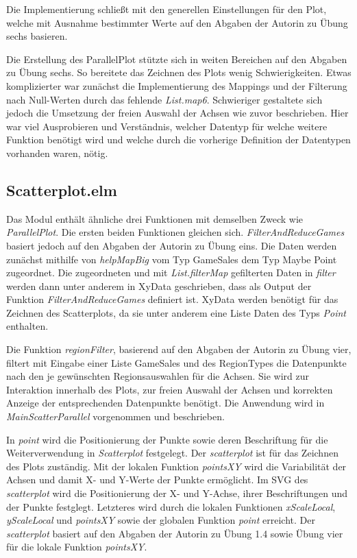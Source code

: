 \documentclass[usegeometry=true]{scrartcl}
\begin{document}
Die Implementierung schließt mit den generellen Einstellungen für den Plot, welche mit Ausnahme bestimmter Werte auf den Abgaben der Autorin zu Übung sechs basieren. 

Die Erstellung des ParallelPlot stützte sich in weiten Bereichen auf den Abgaben zu Übung sechs. 
So bereitete das Zeichnen des Plots wenig Schwierigkeiten. 
Etwas komplizierter war zunächst die Implementierung des Mappings und der Filterung nach Null-Werten durch das fehlende \textit{List.map6}. 
Schwieriger gestaltete sich jedoch die Umsetzung der freien Auswahl der Achsen wie zuvor beschrieben. 
Hier war viel Ausprobieren und Verständnis, welcher Datentyp für welche weitere Funktion benötigt wird und welche durch die vorherige Definition der Datentypen vorhanden waren, nötig.

\subsection{Scatterplot.elm}
Das Modul enthält ähnliche drei Funktionen mit demselben Zweck wie \textit{ParallelPlot}.
Die ersten beiden Funktionen gleichen sich.
\textit{FilterAndReduceGames} basiert jedoch auf den Abgaben der Autorin zu Übung eins.
Die Daten werden zunächst mithilfe von \textit{helpMapBig} vom Typ GameSales dem Typ Maybe Point zugeordnet. 
Die zugeordneten und mit \textit{List.filterMap} gefilterten Daten in \textit{filter} werden dann unter anderem in XyData geschrieben, dass als Output der Funktion \textit{FilterAndReduceGames} definiert ist.
XyData werden benötigt für das Zeichnen des Scatterplots, da sie unter anderem eine Liste Daten des Typs \textit{Point} enthalten.

Die Funktion \textit{regionFilter}, basierend auf den Abgaben der Autorin zu Übung vier, filtert mit Eingabe einer Liste GameSales und des RegionTypes die Datenpunkte nach den je gewünschten Regionsauswahlen für die Achsen. 
Sie wird zur Interaktion innerhalb des Plots, zur freien Auswahl der Achsen und korrekten Anzeige der entsprechenden Datenpunkte benötigt.
Die Anwendung wird in \textit{MainScatterParallel} vorgenommen und beschrieben.

In \textit{point} wird die Positionierung der Punkte sowie deren Beschriftung für die Weiterverwendung in \textit{Scatterplot} festgelegt.
Der \textit{scatterplot} ist für das Zeichnen des Plots zuständig. 
Mit der lokalen Funktion \textit{pointsXY} wird die Variabilität der Achsen und damit X- und Y-Werte der Punkte ermöglicht.
Im SVG des \textit{scatterplot} wird die Positionierung der X- und Y-Achse, ihrer Beschriftungen und der Punkte festglegt. 
Letzteres wird durch die lokalen Funktionen \textit{xScaleLocal}, \textit{yScaleLocal} und \textit{pointsXY} sowie der globalen Funktion \textit{point} erreicht.
Der \textit{scatterplot} basiert auf den Abgaben der Autorin zu Übung 1.4 sowie Übung vier für die lokale Funktion \textit{pointsXY}. 
\end{document}
